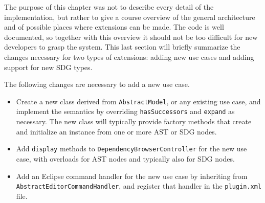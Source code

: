 The purpose of this chapter was not to describe every detail of the implementation, but rather to give a course 
overview of the general architecture and of possible places where extensions can be made. The code is well documented, 
so together with this overview it should not be too difficult for new developers to grasp the system. This last section 
will briefly summarize the changes necessary for two types of extensions: adding new use cases and adding support for 
new SDG types.

The following changes are necessary to add a new use case.
\begin{itemize}
  \item Create a new class derived from \lstinline|AbstractModel|, or any existing use case, and implement the 
  semantics by overriding \lstinline|hasSuccessors| and \lstinline|expand| as necessary. The new class will typically 
  provide factory methods that create and initialize an instance from one or more AST or SDG nodes.
  
  \item Add \lstinline|display| methods to \lstinline|DependencyBrowserController| for the new use case, with overloads 
  for AST nodes and typically also for SDG nodes.
  
  \item Add an Eclipse command handler for the new use case by inheriting from 
  \lstinline|AbstractEditorCommandHandler|, and register that handler in the \SB \lstinline|plugin.xml| file.
\end{itemize}

